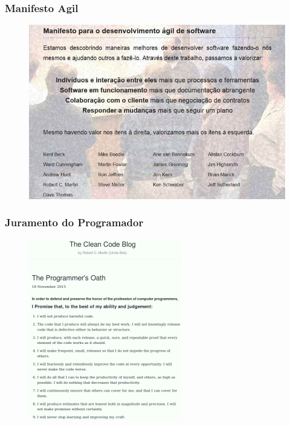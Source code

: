 \begin{frame}
 \frametitle{Manifesto Agil}
  \begin{figure}
   \centering
   \includegraphics[width = \textwidth]{figs/manifesto.jpg}
  \end{figure}
\end{frame}


\begin{frame}
 \frametitle{Juramento do Programador}
  \begin{figure}
   \centering
   \includegraphics[height = \textheight]{figs/theprogrammersoath.png}
  \end{figure}
\end{frame}

